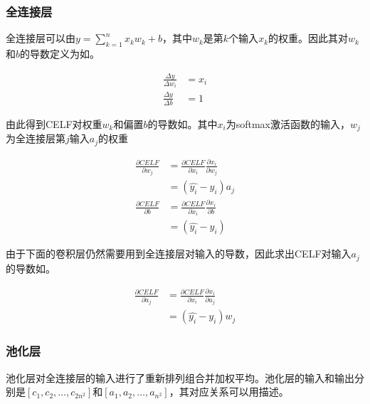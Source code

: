 \subsubsection{全连接层}

全连接层可以由$y=\sum_{k=1}^{n}{x_k w_k} + b$，其中$w_k$是第$k$个输入$x_k$的权重。因此其对$w_k$和$b$的导数定义为如。

\begin{equation}\label{eq:affine-bp}
\begin{aligned}
\frac{\Delta y}{\Delta w_i} &= x_i \\
\frac{\Delta y}{\Delta b} &= 1
\end{aligned}
\end{equation}

由此得到CELF对权重$w_k$和偏置$b$的导数如。其中$x_i$为softmax激活函数的输入，$w_j$为全连接层第$j$输入$a_j$的权重

\begin{equation}\label{eq:CELF-affline-w-b}
\begin{aligned}
\frac{\partial CELF}{\partial w_j} &=
\frac{\partial CELF}{\partial x_i} \frac{\partial x_i}{\partial w_j} \\
&= (\hat{y_i} - y_i)a_j \\
\frac{\partial CELF}{\partial b} &=
\frac{\partial CELF}{\partial x_i} \frac{\partial x_i}{\partial b} \\
&= (\hat{y_i} - y_i)
\end{aligned}
\end{equation}

由于下面的卷积层仍然需要用到全连接层对输入的导数，因此求出CELF对输入$a_j$的导数如。

\begin{equation}\label{eq:affine-a-bp}
\begin{aligned}
\frac{\partial CELF}{\partial a_j} &=
\frac{\partial CELF}{\partial x_i} \frac{\partial x_i}{\partial a_j} \\
&= (\hat{y_i} - y_i)w_j
\end{aligned}
\end{equation}

\subsubsection{池化层}

池化层对全连接层的输入进行了重新排列组合并加权平均。池化层的输入和输出分别是$[c_1, c_2, \dots, c_{2n^2}]$和$[a_1, a_2, \dots , a_{n^2}]$，其对应关系可以用描述。

